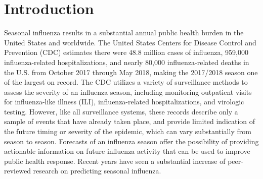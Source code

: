 \documentclass{article}\usepackage[]{graphicx}\usepackage[]{color}
\begin{document}
% 


\section{Introduction}


Seasonal influenza results in a substantial annual public health burden in the United States and worldwide.
The United States Centers for Disease Control and Prevention (CDC) estimates there were 48.8 million cases of influenza, 959,000 influenza-related hospitalizations, and nearly 80,000 influenza-related deaths in the U.S. from October 2017 through May 2018, making the 2017/2018 season one of the largest on record.\cite{CDC2018-estimates} 
The CDC utilizes a variety of surveillance methods to assess the severity of an influenza season, including monitoring outpatient visits for influenza-like illness (ILI), influenza-related hospitalizations, and virologic testing.\cite{surv2017} 
However, like all surveillance systems, these records describe only a sample of events that have already taken place, and provide limited indication of the future timing or severity of the epidemic, which can vary substantially from season to season.\cite{CDC2018} 
Forecasts of an influenza season offer the possibility of providing actionable information on future influenza activity that can be used to improve public health response. 
Recent years have seen a substantial increase of peer-reviewed research on predicting seasonal influenza.\cite{Shaman2013,Yang2014,Yang2015,Chretien2016,Kandula2017,osthus2018dynamic,Brooks2018,Pei2018}
\end{document}
